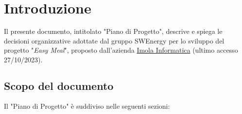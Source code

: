 \section{Introduzione}

Il presente documento, intitolato "Piano di Progetto", descrive e spiega le
decisioni organizzative adottate dal gruppo SWEnergy per lo sviluppo del
progetto "\textit{Easy Meal}", proposto dall'azienda
\href{https://imolainformatica.it/}{Imola Informatica} (ultimo accesso 27/10/2023).

\subsection{Scopo del documento}

Il "Piano di Progetto" è suddiviso nelle seguenti sezioni:

